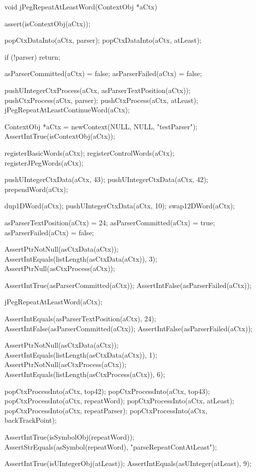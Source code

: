 \startCCode
void jPegRepeatAtLeastWord(ContextObj *aCtx) {
  assert(isContextObj(aCtx));
  
  popCtxDataInto(aCtx, parser);
  popCtxDataInto(aCtx, atLeast);
  
  if (!parser) return;
  
  asParserCommitted(aCtx) = false;
  asParserFailed(aCtx)    = false;
  
  pushUIntegerCtxProcess(aCtx, asParserTextPosition(aCtx));
  pushCtxProcess(aCtx, parser);
  pushCtxProcess(aCtx, atLeast);
  jPegRepeatAtLeastContinueWord(aCtx);
}
\stopCCode

\startCTest
  ContextObj *aCtx = newContext(NULL, NULL, "testParser");
  AssertIntTrue(isContextObj(aCtx));
  
  registerBasicWords(aCtx);
  registerControlWords(aCtx);
  registerJPegWords(aCtx);
  
  pushUIntegerCtxData(aCtx, 43);
  pushUIntegerCtxData(aCtx, 42);
  prependWord(aCtx);
  
  dup1DWord(aCtx);
  pushUIntegerCtxData(aCtx, 10);
  swap12DWord(aCtx);
  
  asParserTextPosition(aCtx) = 24;
  asParserCommitted(aCtx)    = true;
  asParserFailed(aCtx)       = false;
  
  AssertPtrNotNull(asCtxData(aCtx));
  AssertIntEquals(listLength(asCtxData(aCtx)), 3);
  AssertPtrNull(asCtxProcess(aCtx));
  
  AssertIntTrue(asParserCommitted(aCtx));
  AssertIntFalse(asParserFailed(aCtx));
  
  jPegRepeatAtLeastWord(aCtx);
  
  AssertIntEquals(asParserTextPosition(aCtx), 24);
  AssertIntFalse(asParserCommitted(aCtx));
  AssertIntFalse(asParserFailed(aCtx));
  
  AssertPtrNotNull(asCtxData(aCtx));
  AssertIntEquals(listLength(asCtxData(aCtx)), 1);
  AssertPtrNotNull(asCtxProcess(aCtx));
  AssertIntEquals(listLength(asCtxProcess(aCtx)), 6);
  
  popCtxProcessInto(aCtx, top42);
  popCtxProcessInto(aCtx, top43);
  popCtxProcessInto(aCtx, repeatWord);
  popCtxProcessInto(aCtx, atLeast);
  popCtxProcessInto(aCtx, repeatParser);
  popCtxProcessInto(aCtx, backTrackPoint);
  
  AssertIntTrue(isSymbolObj(repeatWord));
  AssertStrEquals(asSymbol(repeatWord), "parseRepeatContAtLeast");
  
  AssertIntTrue(isUIntegerObj(atLeast));
  AssertIntEquals(asUInteger(atLeast), 9);
  
